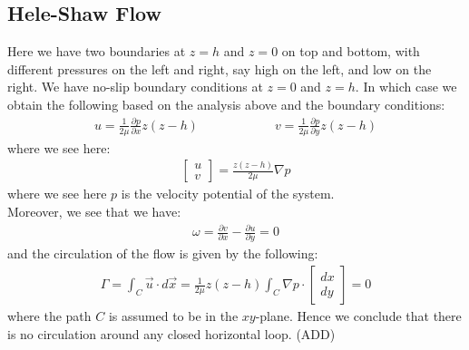 \documentclass[11pt]{book}
\theoremstyle{break}
\theoremstyle{break}
\newcommand{\pd}{\partial}
\newcommand{\bmat}[1]{\begin{bmatrix} #1 \end{bmatrix}}
\begin{document}
\subsection*{Hele-Shaw Flow}
Here we have two boundaries at $z=h$ and $z=0$ on top and bottom, with different pressures on the left and right, say high on the left, and low on the right. We have no-slip boundary conditions at $z=0$ and $z=h$. In which case we obtain the following based on the analysis above and the boundary conditions:
\begin{align*}
u = \frac{1}{2\mu}\frac{\pd p}{\pd x}z(z-h) \qquad\qquad\qquad v=\frac{1}{2\mu}\frac{\pd p}{\pd y}z(z-h)
\end{align*}
where we see here:
\begin{align*}
\bmat{u \\ v} = \frac{z(z-h)}{2\mu}\nabla p
\end{align*}
where we see here $p$ is the velocity potential of the system. \\
Moreover, we see that we have:
\begin{align*}
\omega = \frac{\pd v}{\pd x} - \frac{\pd u}{\pd y} = 0
\end{align*}
and the circulation of the flow is given by the following:
\begin{align*}
\Gamma = \int_C \vec{u}\cdot d\vec{x} = \frac{1}{2\mu}z(z-h) \int_C \nabla p \cdot \bmat{dx \\ dy} = 0
\end{align*}
where the path $C$ is assumed to be in the $xy$-plane. Hence we conclude that there is no circulation around any closed horizontal loop. (ADD)\\
\end{document}
